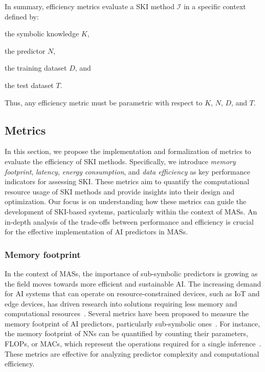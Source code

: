 In summary, efficiency metrics evaluate a \gls{SKI} method \(\mathcal{I}\) in a specific context defined by:
%
\begin{inlinelist}
    \item the symbolic knowledge \(K\),
    \item the predictor \(N\),
    \item the training dataset \(D\), and
    \item the test dataset \(T\).
\end{inlinelist}
%
Thus, any efficiency metric must be parametric with respect to \(K\), \(N\), \(D\), and \(T\).


\subsection{Metrics}\label{subsec:ski-meets-intelligent-agents-metrics}
%
In this section, we propose the implementation and formalization of metrics to evaluate the efficiency of \gls{SKI} methods.
%
Specifically, we introduce \emph{memory footprint}, \emph{latency}, \emph{energy consumption}, and \emph{data efficiency} as key performance indicators for assessing \gls{SKI}.
%
These metrics aim to quantify the computational resource usage of \gls{SKI} methods and provide insights into their design and optimization.
%
Our focus is on understanding how these metrics can guide the development of \gls{SKI}-based systems, particularly within the context of \glspl{MAS}.
%
An in-depth analysis of the trade-offs between performance and efficiency is crucial for the effective implementation of AI predictors in \glspl{MAS}.
%

\subsubsection{Memory footprint}\label{subsubsec:ski-meets-intelligent-agents-memory-footprint}
%
In the context of \glspl{MAS}, the importance of sub-symbolic predictors is growing as the field moves towards more efficient and sustainable \gls{AI}.
%
The increasing demand for \gls{AI} systems that can operate on resource-constrained devices, such as IoT and edge devices, has driven research into solutions requiring less memory and computational resources~\cite{DBLP:journals/tplp/KornerLBCDHMWDA22,shallow2deep-extraamas2021,nnconstrained-applsci11}.
%
Several metrics have been proposed to measure the memory footprint of \gls{AI} predictors, particularly sub-symbolic ones~\cite{Kang2018,wu2018shift,LiberisEurosys2021}.
%
For instance, the memory footprint of \glspl{NN} can be quantified by counting their parameters, \glspl{FLOP}, or \glspl{MAC}, which represent the operations required for a single inference~\cite{skiqs-woa2022,huang_condensenet_2018,cheng_msnet_2019}.
%
These metrics are effective for analyzing predictor complexity and computational efficiency.

